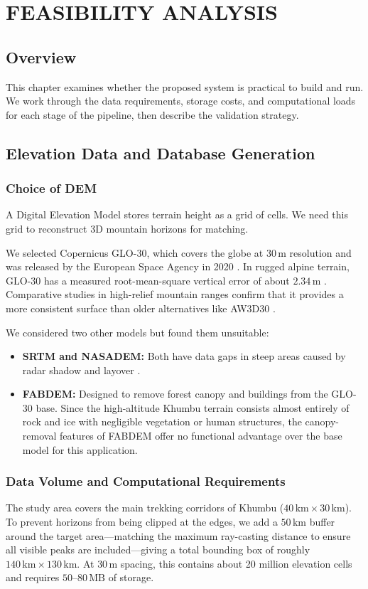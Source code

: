 \chapter{FEASIBILITY ANALYSIS}

\section{Overview}
This chapter examines whether the proposed system is practical to build and run. We work through the data requirements, storage costs, and computational loads for each stage of the pipeline, then describe the validation strategy.

\section{Elevation Data and Database Generation}
\label{sec:elevation}

\subsection{Choice of DEM}
A Digital Elevation Model stores terrain height as a grid of cells. We need this grid to reconstruct 3D mountain horizons for matching.

We selected Copernicus GLO-30, which covers the globe at $30\,\text{m}$ resolution and was released by the European Space Agency in 2020 \cite{Franks2023, Trevisani2023}. In rugged alpine terrain, GLO-30 has a measured root-mean-square vertical error of about $2.34\,\text{m}$ \cite{Franks2023}. Comparative studies in high-relief mountain ranges confirm that it provides a more consistent surface than older alternatives like AW3D30 \cite{Trevisani2023}.

We considered two other models but found them unsuitable:
\begin{itemize}
    \item \textbf{SRTM and NASADEM:} Both have data gaps in steep areas caused by radar shadow and layover \cite{Franks2023}.
    \item \textbf{FABDEM:} Designed to remove forest canopy and buildings from the GLO-30 base. Since the high-altitude Khumbu terrain consists almost entirely of rock and ice with negligible vegetation or human structures, the canopy-removal features of FABDEM offer no functional advantage over the base model for this application.
\end{itemize}

\subsection{Data Volume and Computational Requirements}
The study area covers the main trekking corridors of Khumbu ($40\,\text{km} \times 30\,\text{km}$). To prevent horizons from being clipped at the edges, we add a $50\,\text{km}$ buffer around the target area—matching the maximum ray-casting distance to ensure all visible peaks are included—giving a total bounding box of roughly $140\,\text{km} \times 130\,\text{km}$. At $30\,\text{m}$ spacing, this contains about 20 million elevation cells and requires $50$--$80\,\text{MB}$ of storage.

